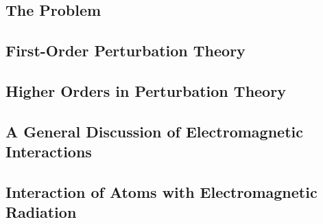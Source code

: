 \subsection{The Problem}

\subsection{First-Order Perturbation Theory}

\subsection{Higher Orders in Perturbation Theory}

\subsection{A General Discussion of Electromagnetic Interactions}

\subsection{Interaction of Atoms with Electromagnetic Radiation}
